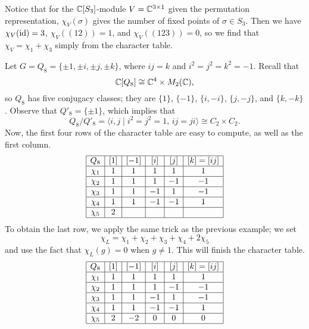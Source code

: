 \begin{remark}{}
    Notice that for the $\mathbb{C}[S_3]$-module $V = \mathbb{C}^{3\times1}$ given the permutation 
    representation, $\chi_V(\sigma)$ gives the number of fixed points of 
    $\sigma \in S_3$. Then we have $\chi_V(\operatorname{id}) = 3$, $\chi_V((12)) = 1$, and 
    $\chi_V((123)) = 0$, so we find that $\chi_V = \chi_1 + \chi_3$ simply from 
    the character table. 
\end{remark}

\begin{exmp}{}
    Let $G = Q_8 = \{\pm1, \pm i, \pm j, \pm k\}$, where $ij = k$ and 
    $i^2 = j^2 = k^2 = -1$. Recall that 
    \[ \mathbb{C}[Q_8] \cong \mathbb{C}^4 \times M_2(\mathbb{C}), \] 
    so $Q_8$ has five conjugacy classes; they are $\{1\}$, $\{-1\}$, 
    $\{i, -i\}$, $\{j, -j\}$, and $\{k, -k\}$. Observe that $Q'_8 = \{\pm1\}$, 
    which implies that 
    \[ Q_8/Q'_8 = \langle i, j \mid i^2 = j^2 = 1,\, ij = ji 
    \rangle \cong C_2 \times C_2 . \] 
    Now, the first four rows of the character table are easy to compute, 
    as well as the first column. 
    \begin{align*}
        \begin{array}{|c|c|c|c|c|c|}
            \hline
            Q_8    & [1] & [-1] & [i] & [j] & [k] = [ij] \\ \hline
            \chi_1 & 1   & 1    & 1   & 1   & 1          \\ \hline
            \chi_2 & 1   & 1    & 1   & -1  & -1         \\ \hline
            \chi_3 & 1   & 1    & -1  & 1   & -1         \\ \hline
            \chi_4 & 1   & 1    & -1  & -1  & 1          \\ \hline
            \chi_5 & 2   &      &     &     &            \\ \hline 
        \end{array} 
    \end{align*}
    To obtain the last row, we apply the same trick as the previous example; 
    we set 
    \[ \chi_L = \chi_1 + \chi_2 + \chi_3 + \chi_4 + 2\chi_5 \] 
    and use the fact that $\chi_L(g) = 0$ when $g \neq 1$. This will finish 
    the character table.
    \begin{align*}
        \begin{array}{|c|c|c|c|c|c|}
            \hline
            Q_8    & [1] & [-1] & [i] & [j] & [k] = [ij] \\ \hline
            \chi_1 & 1   & 1    & 1   & 1   & 1          \\ \hline
            \chi_2 & 1   & 1    & 1   & -1  & -1         \\ \hline
            \chi_3 & 1   & 1    & -1  & 1   & -1         \\ \hline
            \chi_4 & 1   & 1    & -1  & -1  & 1          \\ \hline
            \chi_5 & 2   & -2   & 0   & 0   & 0          \\ \hline 
        \end{array} 
    \end{align*} 
\end{exmp}

